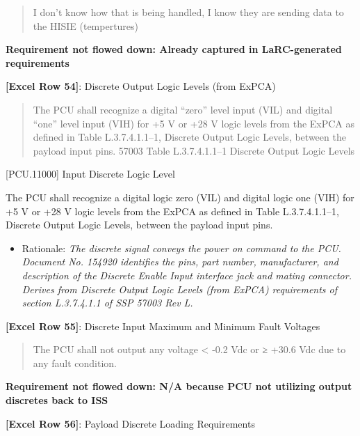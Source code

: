 \begin{quote}
I don't know how that is being handled, I know they are sending data to the HISIE (tempertures)
\end{quote}

\textbf{Requirement not flowed down: Already captured in LaRC-generated requirements}

\textbf{[Excel Row 54]}: Discrete Output Logic Levels (from ExPCA)

\begin{quote}
The PCU shall recognize a digital “zero” level input (VIL) and digital “one” level input (VIH) for +5 V or +28 V logic levels from the ExPCA as defined in Table L.3.7.4.1.1--1, Discrete Output Logic Levels, between the payload input pins.
57003 Table L.3.7.4.1.1--1 Discrete Output Logic Levels
\end{quote}

[PCU.11000] Input Discrete Logic Level

The PCU shall recognize a digital logic zero (VIL) and digital logic one (VIH) for +5 V or +28 V  logic levels from the ExPCA as defined in Table L.3.7.4.1.1--1, Discrete Output Logic Levels, between the payload input pins.

\begin{itemize}
\item{} Rationale: \emph{The discrete signal conveys the power on command to the PCU. Document No. 154920 identifies the pins, part number, manufacturer, and description of the Discrete Enable Input interface jack and mating connector. Derives from Discrete Output Logic Levels (from ExPCA) requirements of section L.3.7.4.1.1 of SSP 57003 Rev L.}

\end{itemize}

\textbf{[Excel Row 55]}: Discrete Input Maximum and Minimum Fault Voltages

\begin{quote}
The PCU shall not output any voltage < -0.2 Vdc or ≥ +30.6 Vdc due to any fault condition.
\end{quote}

\textbf{Requirement not flowed down: N\slash A because PCU not utilizing output discretes back to ISS}

\textbf{[Excel Row 56]}: Payload Discrete Loading Requirements

